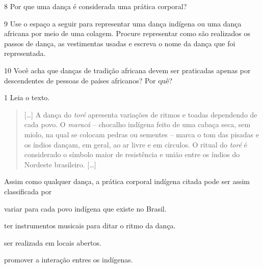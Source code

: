 \num{8} Por que uma dança é considerada uma prática corporal?


\num{9} Use o espaço a seguir para representar uma dança indígena ou uma dança
  africana por meio de uma colagem. Procure representar como são realizados
  os passos de dança, as vestimentas usadas e escreva o nome da dança
  que foi representada.

\begin{mdframed}[linewidth=2pt,linecolor=salmao]
\vspace{6cm}
\end{mdframed}

\num{10} Você acha que danças de tradição africana devem ser praticadas apenas por descendentes de pessoas de países africanos? Por quê?



\num{1} Leia o texto.
\begin{quote}
  {[}\ldots{}{]} A dança do \emph{toré} apresenta variações de ritmos e toadas
  dependendo de cada povo. O \emph{maracá} -- chocalho indígena feito de
  uma cabaça seca, sem miolo, na qual se colocam pedras ou sementes --
  marca o tom das pisadas e os índios dançam, em geral, ao ar livre e em
  círculos. O ritual do \emph{toré} é considerado o símbolo maior de
  resistência e união entre os índios
  do Nordeste brasileiro. {[}\ldots{}{]}

\end{quote}

\noindent{}Assim como qualquer dança, a prática corporal indígena citada pode ser assim classificada por

\begin{escolha}
\item variar para cada povo indígena que existe no Brasil.

\item ter instrumentos musicais para ditar o ritmo da dança.

\item ser realizada em locais abertos.

\item promover a interação entres os indígenas.
\end{escolha}

